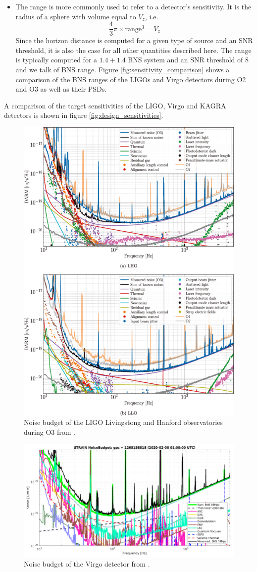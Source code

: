 \begin{itemize}
\item The range is more commonly used to  refer to a detector's sensitivity.
  It is the radius of a sphere with volume equal to $V_z$, i.e.
  \begin{equation}
    \frac{4}{3} \pi \times \textrm{range}^3 = V_z
  \end{equation}
  Since the horizon distance is computed for a given type of source and an SNR threshold, it is also the case for all other quantities described here.
  The range is typically computed for a $1.4 + 1.4$ \msun BNS system and an SNR threshold of 8 and we talk of BNS range.
  Figure \ref{fig:sensitivity_comparison} shows a comparison of the BNS ranges of the LIGOs and Virgo detectors during O2 and O3 as well as their PSDs.
\end{itemize}
A comparison of the target sensitivities of the LIGO, Virgo and KAGRA detectors is shown in figure \ref{fig:design_sensitivities}.


\begin{figure}
  \centering
  \includegraphics[width=0.5\linewidth]{sectionDetection/ligo_sensitivity.png}
  \caption{Noise budget of the LIGO Livingstong and Hanford observatories during O3 from \cite{ligo_sensitivity}.}
  \label{fig:ligo_sensitivity}
\end{figure}


\begin{figure}
  \centering
  \includegraphics[width=0.5\linewidth]{sectionDetection/virgo_noise.png}
  \caption{Noise budget of the Virgo detector from \cite{virgo_characterization}.}
  \label{fig:virgo_sensitivity}
\end{figure}


